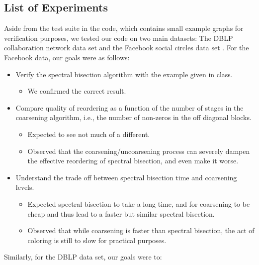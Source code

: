 \documentclass[11pt]{article}
\newcommand{\noi}{\noindent}
\begin{document}
\subsection{List of Experiments}

Aside from the test suite in the code, which contains small example graphs
for verification purposes, we tested our code on two main datasets: The DBLP
collaboration network data set and the Facebook social circles data set
\cite{snapnets,facebook,dblp}. For the Facebook data, our goals were as follows: 

\begin{itemize}
	\item Verify the spectral bisection algorithm with the example given in
		class. 
		\begin{itemize}
			\item We confirmed the correct result.
		\end{itemize}
	\item Compare quality of reordering as a function of the number of
stages in the coarsening algorithm, i.e., the number of non-zeros in the off
diagonal blocks. 
		\begin{itemize}
			\item Expected to see not much of a different. 
			\item Observed that the coarsening/uncoarsening process can
				severely dampen the effective reordering of
				spectral bisection, and even make it worse.
		\end{itemize}
	\item Understand the trade off between spectral bisection time and
		coarsening levels. 
		\begin{itemize}
			\item Expected spectral bisection to take a long time,
				and for coarsening to be cheap and thus lead to
				a faster but similar spectral bisection. 
			\item Observed that while coarsening is faster than
				spectral bisection, the act of coloring is still
				to slow for practical purposes.
		\end{itemize}
\end{itemize}
\noi Similarly, for the DBLP data set, our goals were to: 
\end{document}
